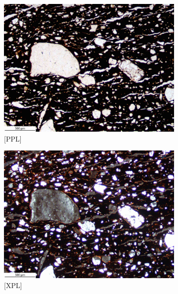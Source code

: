 \documentclass[a4paper]{article}
\begin{document}
\begin{figure}[H]
	\centering
	\begin{subfigure}[t]{.49\textwidth}
		\includegraphics[width=\textwidth]{ThinSections/5-1_4x_PPL.jpg}
		\caption{[PPL]}
	\end{subfigure}\hspace{.5em}\hfill
	\begin{subfigure}[t]{.49\textwidth}
		\includegraphics[width=\textwidth]{ThinSections/5-1_4x_XPL.jpg}
		\caption{[XPL]}
	\end{subfigure}
	\begin{subfigure}[t]{.49\textwidth}

\end{subfigure}
\end{figure}
\end{document}
